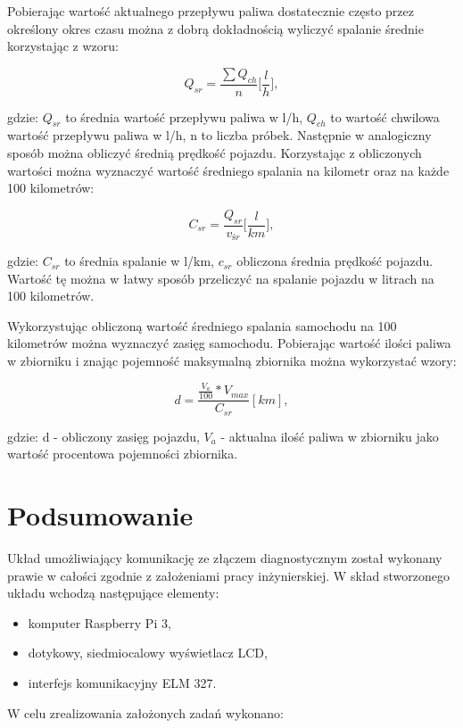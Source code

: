 \documentclass[12pt, twoside]{article} %
\numberwithin{equation}{subsection}
\numberwithin{figure}{section}
\numberwithin{table}{section}
\begin{document}
	Pobierając wartość aktualnego przepływu paliwa dostatecznie często przez określony okres czasu można z dobrą dokładnością wyliczyć spalanie średnie korzystając z wzoru:
	
	\begin{equation}
		Q_{sr} = \frac{\sum{Q_{ch}}}{n} \bigg[\frac{l}{h}\bigg],
	\end{equation}		

gdzie: $Q_{sr}$ to średnia wartość przepływu paliwa w l/h, $Q_{ch}$ to wartość chwilowa wartość przepływu paliwa w l/h, n to liczba próbek. Następnie w analogiczny sposób można obliczyć średnią prędkość pojazdu. Korzystając z obliczonych wartości można wyznaczyć wartość średniego spalania na kilometr oraz na każde 100 kilometrów:
	
	\begin{equation}
		C_{sr} = \frac{Q_{sr}}{v_{śr}} \bigg[\frac{l}{km}\bigg],
	\end{equation}

gdzie: $C_{sr}$ to średnia spalanie w l/km, $c_{sr}$ obliczona średnia prędkość pojazdu. Wartość tę można w łatwy sposób przeliczyć na spalanie pojazdu w litrach na 100 kilometrów.

	Wykorzystując obliczoną wartość średniego spalania samochodu na 100 kilometrów można wyznaczyć zasięg samochodu. Pobierając wartość ilości paliwa w zbiorniku i znając pojemność maksymalną zbiornika można wykorzystać wzory:
	
	\begin{equation}
		d = \frac{\frac{V_{a}}{100} * V_{max}}{C_{sr}} [km],
	\end{equation}
	
	gdzie: d - obliczony zasięg pojazdu, $V_{a}$ - aktualna ilość paliwa w zbiorniku jako wartość procentowa pojemności zbiornika.
		
	\newpage
	
	\section{Podsumowanie}
	
	\hspace{0.5cm}Układ umożliwiający komunikację ze złączem diagnostycznym został wykonany prawie w całości zgodnie z założeniami pracy inżynierskiej. W skład stworzonego układu wchodzą następujące elementy:

	\begin{itemize}
		\item{komputer Raspberry Pi 3,}
		\item{dotykowy, siedmiocalowy wyświetlacz LCD,}
		\item{interfejs komunikacyjny ELM 327.}
	\end{itemize}	
	W celu zrealizowania założonych zadań wykonano:
	
\end{document}
